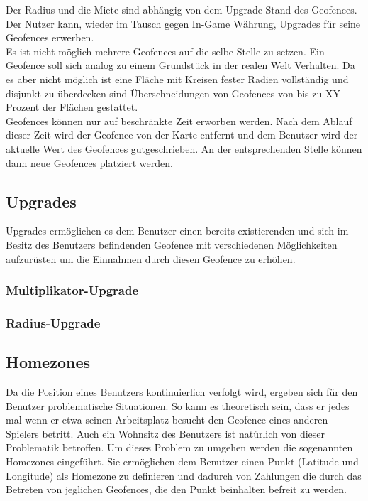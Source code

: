 \documentclass{scrreprt}
\begin{document}
Der Radius und die Miete sind abhängig von dem Upgrade-Stand des Geofences. Der Nutzer kann, wieder im Tausch gegen In-Game Währung, Upgrades für seine Geofences erwerben.\\

Es ist nicht möglich mehrere Geofences auf die selbe Stelle zu setzen. Ein Geofence soll sich analog zu einem Grundstück in der realen Welt Verhalten. Da es aber nicht möglich ist eine Fläche mit Kreisen fester Radien vollständig und disjunkt zu überdecken sind Überschneidungen von Geofences von bis zu XY Prozent der Flächen gestattet.\\  

Geofences können nur auf beschränkte Zeit erworben werden. Nach dem Ablauf dieser Zeit wird der Geofence von der Karte entfernt und dem Benutzer wird der aktuelle Wert des Geofences gutgeschrieben. An der entsprechenden Stelle können dann neue Geofences platziert werden.
\subsection{Upgrades}
Upgrades ermöglichen es dem Benutzer einen bereits existierenden und sich im Besitz des Benutzers befindenden Geofence mit verschiedenen Möglichkeiten aufzurüsten um die Einnahmen durch diesen Geofence zu erhöhen.
\subsubsection{Multiplikator-Upgrade}

\subsubsection{Radius-Upgrade}

\subsection{Homezones}
Da die Position eines Benutzers kontinuierlich verfolgt wird, ergeben sich für den Benutzer problematische Situationen. So kann es theoretisch sein, dass er jedes mal wenn er etwa seinen Arbeitsplatz besucht den Geofence eines anderen Spielers betritt. Auch ein Wohnsitz des Benutzers ist natürlich von dieser Problematik betroffen. Um dieses Problem zu umgehen werden die sogenannten Homezones eingeführt. Sie ermöglichen dem Benutzer einen Punkt (Latitude und Longitude) als Homezone zu definieren und dadurch von Zahlungen die durch das Betreten von jeglichen Geofences, die den Punkt beinhalten befreit zu werden.
\end{document}
